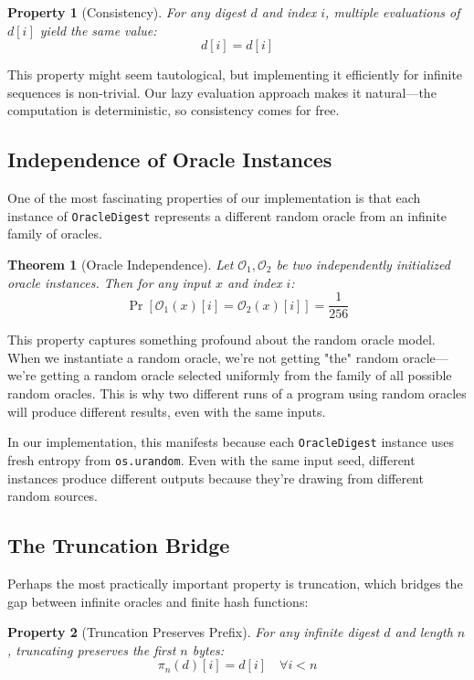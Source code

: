 \documentclass[11pt]{article}
\newtheorem{theorem}{Theorem}
\newtheorem{property}{Property}
\begin{document}
\begin{property}[Consistency]
For any digest $d$ and index $i$, multiple evaluations of $d[i]$ yield the same value:
$$d[i] = d[i]$$
\end{property}

This property might seem tautological, but implementing it efficiently for infinite sequences is non-trivial. Our lazy evaluation approach makes it natural---the computation is deterministic, so consistency comes for free.

\subsection{Independence of Oracle Instances}

One of the most fascinating properties of our implementation is that each instance of \texttt{OracleDigest} represents a different random oracle from an infinite family of oracles.

\begin{theorem}[Oracle Independence]
Let $\mathcal{O}_1, \mathcal{O}_2$ be two independently initialized oracle instances. Then for any input $x$ and index $i$:
$$\Pr[\mathcal{O}_1(x)[i] = \mathcal{O}_2(x)[i]] = \frac{1}{256}$$
\end{theorem}

This property captures something profound about the random oracle model. When we instantiate a random oracle, we're not getting "the" random oracle---we're getting a random oracle selected uniformly from the family of all possible random oracles. This is why two different runs of a program using random oracles will produce different results, even with the same inputs.

In our implementation, this manifests because each \texttt{OracleDigest} instance uses fresh entropy from \texttt{os.urandom}. Even with the same input seed, different instances produce different outputs because they're drawing from different random sources.

\subsection{The Truncation Bridge}

Perhaps the most practically important property is truncation, which bridges the gap between infinite oracles and finite hash functions:

\begin{property}[Truncation Preserves Prefix]
For any infinite digest $d$ and length $n$, truncating preserves the first $n$ bytes:
$$\pi_n(d)[i] = d[i] \quad \forall i < n$$
\end{property}
\end{document}
